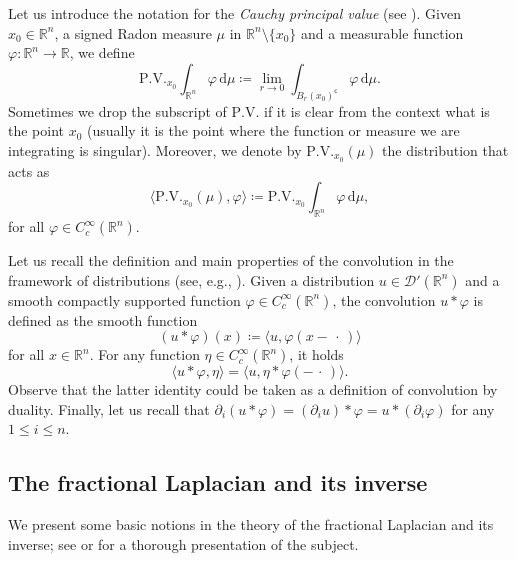\documentclass[10pt, reqno]{amsart}
\theoremstyle{plain}
\theoremstyle{remark}
\theoremstyle{definition}
\numberwithin{equation}{section}
\theoremstyle{plain}
\newcommand{\R}{\ensuremath{\mathbb R}} %
\newcommand{\scalprod}[1]{\ensuremath{\langle #1\rangle}} %
\renewcommand{\complement}{\ensuremath{\mathsf{c}}} %
\newcommand{\emptyparam}{\ensuremath{\,\cdot\,}}%
\newcommand{\defeq}{\ensuremath{\coloneqq}}%
\begin{document}
Let us introduce the notation for the \emph{Cauchy principal value} (see \cite[Chapter 3, Section 8]{MR4703940}).
Given $x_0\in\R^n$, a signed Radon measure $\mu$ in $\R^n\setminus\{x_0\}$ and a measurable function $\varphi:\R^n\to\R$, we define
\begin{equation*}
   \mathrm{P.V.}_{x_0}\int_{\R^n} \varphi\, \mathrm{d} \mu \defeq 
    \lim_{r\to 0}
    \int_{B_r(x_0)^\complement} \varphi\, \mathrm{d} \mu. 
\end{equation*}
Sometimes we drop the subscript of $\mathrm{P.V.}$ if it is clear from the context what is the point $x_0$ (usually it is the point where the function or measure we are integrating is singular).
Moreover, we denote by $ \mathrm{P.V.}_{x_0}(\mu)$ the distribution that acts as
\begin{equation*}
    \scalprod{ \mathrm{P.V.}_{x_0}(\mu), \varphi} \defeq  \mathrm{P.V.}_{x_0}\int_{\R^n} \varphi\, \mathrm{d} \mu,
\end{equation*}
for all $\varphi\in C^\infty_c(\R^n)$.

Let us recall the definition and main properties of the convolution in the framework of distributions (see, e.g., \cite[Chapter IV]{MR1996773}).
Given a distribution $u\in \mathcal D'(\R^n)$ and a smooth compactly supported function $\varphi\in C^\infty_c(\R^n)$, the convolution $u\ast \varphi$ is defined as the smooth function
\begin{equation}\label{eq:def_convolution}
    (u\ast\varphi)(x) \defeq \scalprod{u, \varphi(x-\emptyparam)}
\end{equation}
for all $x\in\R^n$.
For any function $\eta\in C^\infty_c(\R^n)$, it holds
\begin{equation}\label{eq:def_convolution_duality}
    \scalprod{u\ast\varphi, \eta} = \scalprod{u, \eta\ast\varphi(-\emptyparam)}.
\end{equation}
Observe that the latter identity could be taken as a definition of convolution by duality.
Finally, let us recall that $\partial_i(u\ast \varphi) = (\partial_i u)\ast\varphi = u\ast(\partial_i\varphi)$ for any $1\le i\le n$.

\subsection{The fractional Laplacian and its inverse}
\label{ssec:fraclaplace}
We present some basic notions in the theory of the fractional Laplacian and its inverse; see \cite{Landkof1972,Stinga2019} or \cite[Section 2]{Silvestre2007} for a thorough presentation of the subject.
\end{document}
